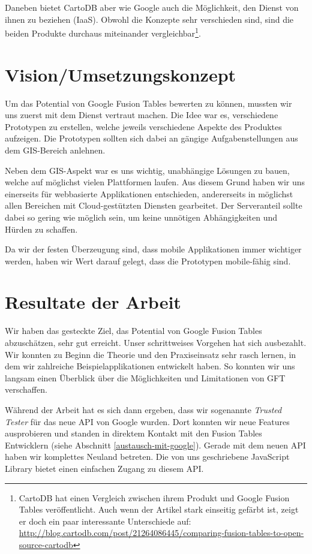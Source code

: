Daneben bietet CartoDB aber wie Google auch die Möglichkeit, den Dienst von ihnen zu beziehen (\gls{IaaS}). Obwohl  die Konzepte sehr verschieden sind, sind die beiden Produkte durchaus miteinander vergleichbar\footnote{CartoDB hat einen Vergleich zwischen ihrem Produkt und Google Fusion Tables veröffentlicht. Auch wenn der Artikel stark einseitig gefärbt ist, zeigt er doch ein paar interessante Unterschiede auf: \url{http://blog.cartodb.com/post/21264086445/comparing-fusion-tables-to-open-source-cartodb}}.

\section{Vision/Umsetzungskonzept}
Um das Potential von Google Fusion Tables bewerten zu können, mussten wir uns zuerst mit dem Dienst vertraut machen. Die Idee war es, verschiedene Prototypen zu erstellen, welche jeweils verschiedene Aspekte des Produktes aufzeigen. Die Prototypen sollten sich dabei an gängige Aufgabenstellungen aus dem \gls{GIS}-Bereich anlehnen.

Neben dem \gls{GIS}-Aspekt war es uns wichtig, unabhängige Lösungen zu bauen, welche auf möglichst vielen Plattformen laufen. Aus diesem Grund haben wir uns einerseits für webbasierte Applikationen entschieden, andererseits in möglichst allen Bereichen mit \gls{Cloud}-gestützten Diensten gearbeitet. Der Serveranteil sollte dabei so gering wie möglich sein, um keine unnötigen Abhängigkeiten und Hürden zu schaffen.

Da wir der festen Überzeugung sind, dass mobile Applikationen immer wichtiger werden, haben wir Wert darauf gelegt, dass die Prototypen mobile-fähig sind. 

\section{Resultate der Arbeit}
Wir haben das gesteckte Ziel, das Potential von Google Fusion Tables abzuschätzen, sehr gut erreicht. Unser schrittweises Vorgehen hat sich ausbezahlt. Wir konnten zu Beginn die Theorie und den Praxiseinsatz sehr rasch lernen, in dem wir zahlreiche Beispielapplikationen entwickelt haben. So konnten wir uns langsam einen Überblick über die Möglichkeiten und Limitationen von GFT verschaffen.

Während der Arbeit hat es sich dann ergeben, dass wir sogenannte \emph{Trusted Tester} für das neue \gls{API} von Google wurden. Dort konnten wir neue Features ausprobieren und standen in direktem Kontakt mit den Fusion Tables Entwicklern (siehe Abschnitt \ref{austausch-mit-google}). Gerade mit dem neuen \gls{API} haben wir komplettes Neuland betreten. Die von uns geschriebene JavaScript Library bietet einen einfachen Zugang zu diesem \gls{API}.

